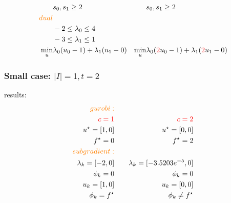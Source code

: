 \begin{frame}
\begin{align*}
                           & s_0, s_1 \ge 2                                     &                       & s_0, s_1 \ge 2                                                               \\
    \textcolor{orange}{dual}                                                                                                                                                           \\
                           & -2 \le \lambda_0 \le 4                             &                       &                                                                              \\
                           & -3 \le \lambda_1 \le 1                                                                                                                                    \\
    \min_u                 & \lambda_0 (u_0 - 1) + \lambda_1 (u_1 - 0)          & \min_u                & \lambda_0 (\textcolor{red}{2}u_0 - 1)+ \lambda_1 (\textcolor{red}{2}u_1 - 0)
  \end{align*}

\end{frame}
\begin{frame}
  \frametitle{Small case: \(|I| = 1, t = 2\) }
  results:
  \begin{align*}
    \textcolor{orange}{gurobi:}                                      \\
    \textcolor{red}{c = 1} &       & \textcolor{red}{c =2}           \\
    u^\star = [1, 0]       & \quad & u^\star = [0, 0]                \\
    f^\star = 0            &       & f^\star = 2                     \\
    \textcolor{orange}{subgradient:}                                 \\
    \lambda_k = [-2, 0]    &       & \lambda_k = [-3.5203e^{-5},  0] \\
    \phi_k = 0             &       & \phi_k = 0                      \\
    u_k = [1, 0]           &       & u_k = [0, 0]                    \\
    \phi_k = f^\star       &       & \phi_k \neq f^\star
  \end{align*}

\end{frame}

